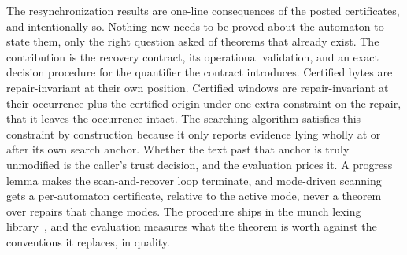 \documentclass[11pt,a4paper]{article}
\theoremstyle{definition}
\theoremstyle{plain}
\theoremstyle{remark}
\begin{document}
The resynchronization results are one-line consequences of the posted certificates, and intentionally so. Nothing new
needs to be proved about the automaton to state them, only the right question asked of theorems that already exist. The
contribution is the recovery contract, its operational validation, and an exact decision procedure for the quantifier
the contract introduces. Certified bytes are repair-invariant at their own position. Certified windows are
repair-invariant at their occurrence plus the certified origin under one extra constraint on the repair, that it leaves
the occurrence intact. The searching algorithm satisfies this constraint by construction because it only reports
evidence lying wholly at or after its own search anchor. Whether the text past that anchor is truly unmodified is the
caller's trust decision, and the evaluation prices it. A progress lemma makes the scan-and-recover loop terminate, and
mode-driven scanning gets a per-automaton certificate, relative to the active mode, never a theorem over repairs that
change modes. The procedure ships in the munch lexing library~\citep{munch}, and the evaluation measures what the
theorem is worth against the conventions it replaces, in quality.
\end{document}
